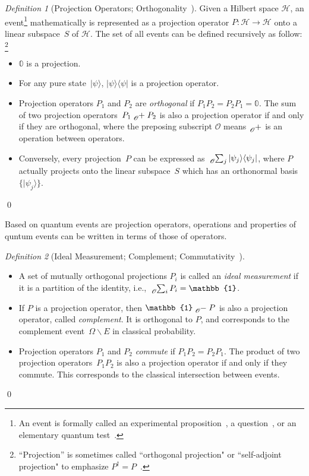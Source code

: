 \documentclass{article}
\theoremstyle{remark}
\newtheorem{definition}{Definition}
\newcommand{\Hilb}{\mathcal{H}}
\newcommand{\ket}[1]{|#1\rangle}
\newcommand{\proj}[1]{|#1 \rangle\langle #1 |}
\begin{document}
\begin{definition}[Projection Operators;
Orthogonality~\cite{10.2307/2308516,Redhead1987-REDINA,peres1995quantum,Griffiths2003,Swart2013}]
\label{def:Projection} Given a Hilbert space $\Hilb$, an event\footnote{An event
is formally called an experimental proposition~\cite{BirkhoffVonNeumann1936}, a question~\cite{10.2307/2308516,DBLP:journals/corr/abs-0910-2393}, or an
elementary quantum test~\cite{peres1995quantum}.} mathematically is represented as a projection operator $P:\Hilb\rightarrow\Hilb$ onto a linear subspace~$S$ of $\Hilb$. The set of all events can be defined recursively as follow:
\footnote {``Projection'' is sometimes called
``orthogonal projection" or ``self-adjoint projection" to
emphasize $P^{\dagger} = P$~\cite{Griffiths2003,Maassen2010}.}
\begin{itemize}
\item $\mathbb{0}$ is a projection. 
\item For any pure state~$\ket{\psi}$, $\proj{\psi}$ is a projection
operator. 
\item Projection operators $P_1$ and $P_2$ are \emph{orthogonal} if $P_1P_2 =
  P_2P_1 = \mathbb{0}$. The sum of two projection operators~$P_{1}\tensor*[_{\mathscr{O}}]{+}{}P_{2}$
is also a projection operator if and only if they are orthogonal, 
where the preposing subscript $\mathscr{O}$
means $\tensor*[_{\mathscr{O}}]{+}{}$ is an operation between operators. 
\item Conversely, every projection~$P$ can be expressed as
$\tensor*[_{\mathscr{O}}]{\sum}{_j}\proj{\psi_{j}}$,
where $P$ actually projects onto the linear subspace~$S$ which
has an orthonormal basis~$\{\ket{\psi_{j}}\}$. 
\end{itemize}
\qed\end{definition}

Based on quantum events are projection operators, operations and properties of
quntum events can be written in terms of those of operators.

\begin{definition}[Ideal Measurement; Complement;
Commutativity~\cite{Swart2013,peres1995quantum,Griffiths2003}]~
\begin{itemize}
\item A set of mutually orthogonal projections $P_{i}$ is called an \emph{ideal
measurement} if it is a partition of the identity, i.e.,
$\tensor*[_{\mathscr{O}}]{\sum}{_{i}}P_{i}=\mathbb{1}$.
\item If $P$ is a projection operator, then $\mathbb{1}\tensor*[_{\mathscr{O}}]{-}{}P$
is also a projection operator, called \emph{complement}. It is orthogonal to $P$,
and corresponds to the complement event~$\Omega\backslash E$
in classical probability.
\item Projection operators $P_{1}$ and $P_{2}$ \emph{commute} if $P_{1}P_{2}=P_{2}P_{1}$.
The product of two projection operators~$P_{1}P_{2}$ is also a projection
operator if and only if they commute. This corresponds to the classical intersection
between events. 
\end{itemize}
\qed\end{definition}
\end{document}
